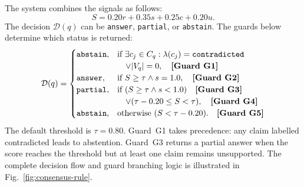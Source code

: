 \documentclass[conference]{IEEEtran}
\begin{document}
The system combines the signals as follows:
\begin{equation}
  S = 0.20r + 0.35s + 0.25c + 0.20u.
  \label{eq:score}
\end{equation}
The decision $\mathcal{D}(q)$ can be \texttt{answer}, \texttt{partial}, or
\texttt{abstain}. The guards below determine which status is returned:
\begin{equation}
\mathcal{D}(q) = \begin{cases}
  \text{\texttt{abstain}}, & \text{if } \exists c_j \in C_q : \lambda(c_j) = \text{\texttt{contradicted}} \\
                           & \quad \lor |V_q| = 0, \quad \text{\textbf{[Guard G1]}} \\
  \text{\texttt{answer}},  & \text{if } S \geq \tau \land s = 1.0, \quad \text{\textbf{[Guard G2]}} \\
  \text{\texttt{partial}}, & \text{if } (S \geq \tau \land s < 1.0) \quad \text{\textbf{[Guard G3]}} \\
                           & \quad \lor (\tau - 0.20 \leq S < \tau), \quad \text{\textbf{[Guard G4]}} \\
  \text{\texttt{abstain}}, & \text{otherwise} \ (S < \tau - 0.20). \quad \text{\textbf{[Guard G5]}}
\end{cases}
\label{eq:decision_func}
\end{equation}
The default threshold is $\tau = 0.80$. Guard~G1 takes precedence: any claim
labelled contradicted leads to abstention. Guard~G3 returns a partial answer when
the score reaches the threshold but at least one claim remains unsupported.
The complete decision flow and guard branching logic is illustrated in Fig.~\ref{fig:consensus-rule}.
\end{document}
